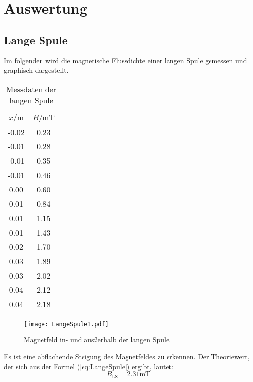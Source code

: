 \section{Auswertung}
\label{sec:Auswertung}

\subsection{Lange Spule}

Im folgenden wird die magnetische Flussdichte einer langen Spule gemessen und graphisch dargestellt.
\begin{table}
\centering
\caption{Messdaten der langen Spule}
  \begin{tabular}{c c}
    \toprule
    $x / \unit\m$ &  $B / \unit{\milli\tesla}$ \\
    \midrule
    -0.02 &         0.23 \\
    -0.01 &         0.28 \\
    -0.01 &         0.35 \\
    -0.01 &         0.46 \\
      0.00 &         0.60 \\
      0.01 &         0.84 \\
      0.01 &         1.15 \\
      0.01 &         1.43 \\
      0.02 &         1.70 \\
      0.03 &         1.89 \\
      0.03 &         2.02 \\
      0.04 &         2.12 \\
      0.04 &         2.18 \\
    \bottomrule
  \end{tabular}
\end{table}

\begin{figure}
  \centering
  \texttt{[image: LangeSpule1.pdf]}
  \caption{Magnetfeld in- und ausßerhalb der langen Spule.}
  \label{fig:LangeSpule1}
\end{figure}

Es ist eine abflachende Steigung des Magnetfeldes zu erkennen. Der Theoriewert, der sich aus der Formel (\ref{eq:LangeSpule}) ergibt, lautet:
\begin{equation}
  B_{\text{LS}} = 2.31 \unit{\milli\tesla}
\end{equation}


